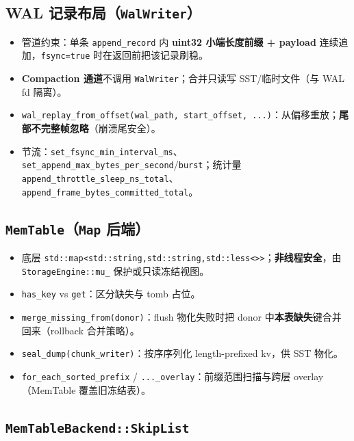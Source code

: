 \subsection{WAL 记录布局（\texttt{WalWriter}）}


\begin{itemize}
  \item 管道约束：单条 \texttt{append\_record} 内 \textbf{uint32 小端长度前缀 + payload} 连续追加，\texttt{fsync=true} 时在返回前把该记录刷稳。
  \item \textbf{Compaction 通道}不调用 \texttt{WalWriter}；合并只读写 SST/临时文件（与 WAL fd 隔离）。
  \item \texttt{wal\_replay\_from\_offset(wal\_path, start\_offset, ...)}：从偏移重放；\textbf{尾部不完整帧忽略}（崩溃尾安全）。
  \item 节流：\texttt{set\_fsync\_min\_interval\_ms}、\texttt{set\_append\_max\_bytes\_per\_second}/\texttt{burst}；统计量 \texttt{append\_throttle\_sleep\_ns\_total}、\texttt{append\_frame\_bytes\_committed\_total}。
\end{itemize}

\subsection{\texttt{MemTable}（\texttt{Map} 后端）}


\begin{itemize}
  \item 底层 \texttt{std::map<std::string,std::string,std::less<>>}；\textbf{非线程安全}，由 \texttt{StorageEngine::mu\_} 保护或只读冻结视图。
  \item \texttt{has\_key} vs \texttt{get}：区分缺失与 tomb 占位。
  \item \texttt{merge\_missing\_from(donor)}：flush 物化失败时把 donor 中\textbf{本表缺失}键合并回来（rollback 合并策略）。
  \item \texttt{seal\_dump(chunk\_writer)}：按序序列化 length-prefixed kv，供 SST 物化。
  \item \texttt{for\_each\_sorted\_prefix} / \texttt{...\_overlay}：前缀范围扫描与跨层 overlay（MemTable 覆盖旧冻结表）。
\end{itemize}

\subsection{\texttt{MemTableBackend::SkipList}}

